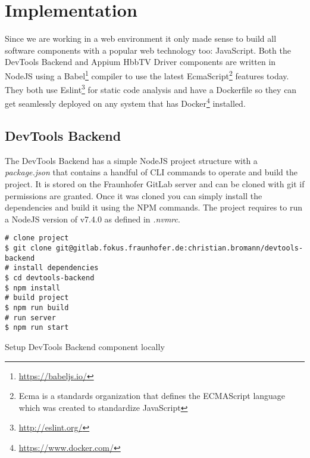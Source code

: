 %

\chapter{Implementation\label{cha:implementation}}

Since we are working in a web environment it only made sense to build all software components with a popular web technology too: JavaScript. Both the DevTools Backend and Appium HbbTV Driver components are written in NodeJS using a Babel\footnote{\url{https://babeljs.io/}} compiler to use the latest EcmaScript\footnote{Ecma is a standards organization that defines the ECMAScript language which was created to standardize JavaScript} features today. They both use Eslint\footnote{\url{http://eslint.org/}} for static code analysis and have a Dockerfile so they can get seamlessly deployed on any system that has Docker\footnote{\url{https://www.docker.com/}} installed.

\section{DevTools Backend\label{sec:implDevtoolsBackend}}

The DevTools Backend has a simple NodeJS project structure with a \textit{package.json} that contains a handful of CLI commands to operate and build the project. It is stored on the Fraunhofer GitLab server and can be cloned with git if permissions are granted. Once it was cloned you can simply install the dependencies and build it using the NPM commands. The project requires to run a NodeJS version of v7.4.0 as defined in \textit{.nvmrc}.

\vspace{1cm}
\begin{listing}[H]
\begin{verbatim}
# clone project
$ git clone git@gitlab.fokus.fraunhofer.de:christian.bromann/devtools-backend
# install dependencies
$ cd devtools-backend
$ npm install
# build project
$ npm run build
# run server
$ npm run start
\end{verbatim}
\caption{Setup DevTools Backend component locally}
\label{lst:setupdevtools}
\end{listing}
\vspace{0.5cm}

